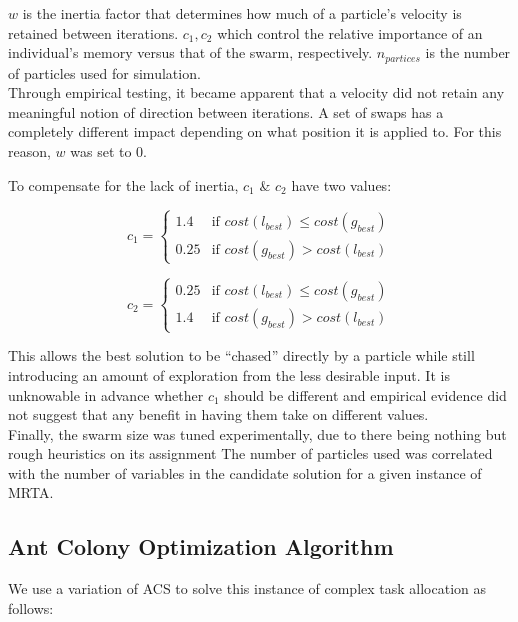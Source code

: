 \documentclass[a4paper]{article}
\begin{document}
$w$ is the inertia factor that determines how much of a particle's velocity is retained between iterations. $c_1, c_2$ which control the relative importance of an individual's memory versus that of the swarm, respectively. $n_{partices}$ is the number of particles used for simulation.\\

Through empirical testing, it became apparent that a velocity did not retain any meaningful notion of direction between iterations. A set of swaps has a completely different impact depending on what position it is applied to. For this reason, $w$ was set to 0.

To compensate for the lack of inertia, $c_1$ \& $c_2$ have two values:

$$
c_1 =
\begin{cases}
1.4 & \text{if } \mathit{cost}(l_\mathit{best}) \leq \mathit{cost}(g_\mathit{best})\\
0.25 & \text{if } \mathit{cost}(g_\mathit{best}) > \mathit{cost}(l_\mathit{best})
\end{cases}
$$

$$
c_2 =
\begin{cases}
0.25 & \text{if } \mathit{cost}(l_\mathit{best}) \leq \mathit{cost}(g_\mathit{best})\\
1.4 & \text{if } \mathit{cost}(g_\mathit{best}) > \mathit{cost}(l_\mathit{best})
\end{cases}
$$

This allows the best solution to be ``chased'' directly by a particle while still introducing an amount of exploration from the less desirable input. It is unknowable in advance whether $c_1$ should be different and empirical evidence did not suggest that any benefit in having them take on different values. \cite{PermutationPSO}\\

Finally, the swarm size was tuned experimentally, due to there being nothing but rough heuristics on its assignment The number of particles used was correlated with the number of variables in the candidate solution for a given instance of MRTA. \cite{PermutationPSO}

\subsection{Ant Colony Optimization Algorithm} %

We use a variation of ACS to solve this instance of complex task allocation as follows:
\end{document}
